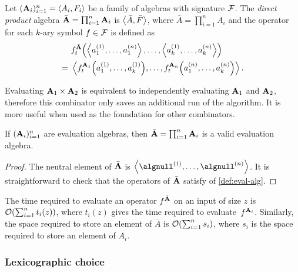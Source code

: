 \begin{definition}
    \label{def:direct-prod}%
    Let \((\mathbf{A}_i)_{i=1}^n = \left\langle A_i, F_i\right\rangle\) be a family of algebras with signature \(\mathcal{F}\).
    The \emph{direct product} algebra \(\bar{\mathbf{A}} = \prod_{i=1}^n \mathbf{A}_i\)
    is \(\left\langle\bar A, \bar F\right\rangle\), where \(\bar A = \prod_{i=1}^n A_i\) and the operator for each \(k\)-ary symbol \(f \in \mathcal{F}\) is defined as
    \begin{align*}
        &f^{\bar\alg}_t\mleft(\tup{a_1^{(1)}, \ldots, a_1^{(n)}}, \ldots, \tup{a_k^{(1)}, \ldots, a_k^{(n)}}\mright) \\
        =\,\, &\tup{f^{\alg_1}_t\mleft(a_1^{(1)}, \ldots, a_k^{(1)}\mright), \ldots, f^{\alg_n}_t\mleft(a_1^{(n)}, \ldots, a_k^{(n)}\mright)}. \qedhere
    \end{align*}
\end{definition}

Evaluating \(\mathbf{A}_1 \times \mathbf{A}_2\) is equivalent to independently evaluating \(\mathbf{A}_1\) and \(\mathbf{A}_2\), therefore this combinator only saves an additional run of the algorithm.
It is more useful when used as the foundation for other combinators.

\begin{lemma}[Validity]
    If \((\mathbf{A}_i)_{i=1}^n\) are evaluation algebras, then \(\bar{\mathbf{A}} = \prod_{i=1}^n\mathbf{A}_i\) is a valid evaluation algebra.
\end{lemma}
\begin{proof}
    The neutral element of \(\bar{\mathbf{A}}\) is \(\tup{\algnull^{(1)}, \ldots, \algnull^{(n)}}\).
    It is straightforward to check that the operators of \(\bar{\mathbf{A}}\) satisfy  of \cref{def:eval-alg}.
\end{proof}

\begin{lemma}[Complexity]
    The time required to evaluate an operator \(f^{\bar{\mathbf{A}}}\) on an input of size \(z\) is \(\operatorname{\mathcal{O}}(\sum_{i=1}^n t_i(z))\), where \(t_i(z)\) gives the time required to evaluate~\(f^{\mathbf{A}_i}\).
    Similarly, the space required to store an element of \(\bar A\) is \(\operatorname{\mathcal{O}}\!\left(\sum_{i=1}^n s_i\right)\), where \(s_i\) is the space required to store an element of \(A_i\).
\end{lemma}

\subsubsection{Lexicographic choice}\label{sec:adp:alg-combin:lex}

